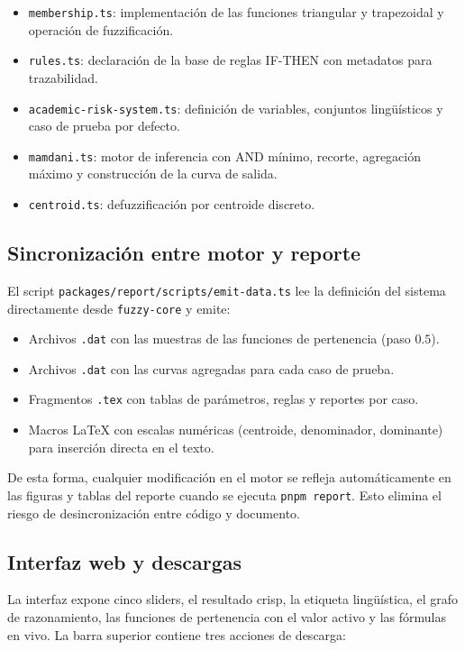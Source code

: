 \begin{itemize}
  \item \texttt{membership.ts}: implementación de las funciones triangular y trapezoidal y operación de fuzzificación.
  \item \texttt{rules.ts}: declaración de la base de reglas IF-THEN con metadatos para trazabilidad.
  \item \texttt{academic-risk-system.ts}: definición de variables, conjuntos lingüísticos y caso de prueba por defecto.
  \item \texttt{mamdani.ts}: motor de inferencia con AND mínimo, recorte, agregación máximo y construcción de la curva de salida.
  \item \texttt{centroid.ts}: defuzzificación por centroide discreto.
\end{itemize}

\subsection{Sincronización entre motor y reporte}

El script \texttt{packages/report/scripts/emit-data.ts} lee la definición del sistema directamente desde \texttt{fuzzy-core} y emite:

\begin{itemize}
  \item Archivos \texttt{.dat} con las muestras de las funciones de pertenencia (paso $0.5$).
  \item Archivos \texttt{.dat} con las curvas agregadas para cada caso de prueba.
  \item Fragmentos \texttt{.tex} con tablas de parámetros, reglas y reportes por caso.
  \item Macros LaTeX con escalas numéricas (centroide, denominador, dominante) para inserción directa en el texto.
\end{itemize}

De esta forma, cualquier modificación en el motor se refleja automáticamente en las figuras y tablas del reporte cuando se ejecuta \texttt{pnpm report}. Esto elimina el riesgo de desincronización entre código y documento.

\subsection{Interfaz web y descargas}

La interfaz expone cinco sliders, el resultado crisp, la etiqueta lingüística, el grafo de razonamiento, las funciones de pertenencia con el valor activo y las fórmulas en vivo. La barra superior contiene tres acciones de descarga:

